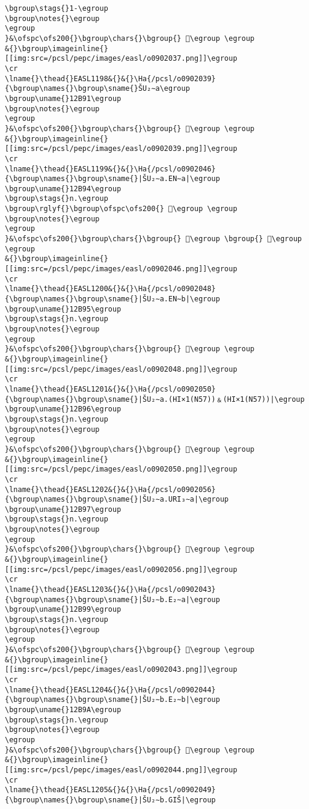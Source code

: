 \begin{verbatim}
\bgroup\stags{}1-\egroup
\bgroup\notes{}\egroup
\egroup
}&\ofspc\ofs200{}\bgroup\chars{}\bgroup{} 󲨆\egroup \egroup
&{}\bgroup\imageinline{}[[img:src=/pcsl/pepc/images/easl/o0902037.png]]\egroup
\cr
\lname{}\thead{}EASL1198&{}&{}\Ha{/pcsl/o0902039}{\bgroup\names{}\bgroup\sname{}ŠU₂∼a\egroup
\bgroup\uname{}12B91\egroup
\bgroup\notes{}\egroup
\egroup
}&\ofspc\ofs200{}\bgroup\chars{}\bgroup{} 𒮑\egroup \egroup
&{}\bgroup\imageinline{}[[img:src=/pcsl/pepc/images/easl/o0902039.png]]\egroup
\cr
\lname{}\thead{}EASL1199&{}&{}\Ha{/pcsl/o0902046}{\bgroup\names{}\bgroup\sname{}|ŠU₂∼a.EN∼a|\egroup
\bgroup\uname{}12B94\egroup
\bgroup\stags{}n.\egroup
\bgroup\rglyf{}\bgroup\ofspc\ofs200{} 𒮔\egroup \egroup
\bgroup\notes{}\egroup
\egroup
}&\ofspc\ofs200{}\bgroup\chars{}\bgroup{} 𒮓\egroup \bgroup{} 𒮔\egroup \egroup
&{}\bgroup\imageinline{}[[img:src=/pcsl/pepc/images/easl/o0902046.png]]\egroup
\cr
\lname{}\thead{}EASL1200&{}&{}\Ha{/pcsl/o0902048}{\bgroup\names{}\bgroup\sname{}|ŠU₂∼a.EN∼b|\egroup
\bgroup\uname{}12B95\egroup
\bgroup\stags{}n.\egroup
\bgroup\notes{}\egroup
\egroup
}&\ofspc\ofs200{}\bgroup\chars{}\bgroup{} 𒮕\egroup \egroup
&{}\bgroup\imageinline{}[[img:src=/pcsl/pepc/images/easl/o0902048.png]]\egroup
\cr
\lname{}\thead{}EASL1201&{}&{}\Ha{/pcsl/o0902050}{\bgroup\names{}\bgroup\sname{}|ŠU₂∼a.(HI×1(N57))﹠(HI×1(N57))|\egroup
\bgroup\uname{}12B96\egroup
\bgroup\stags{}n.\egroup
\bgroup\notes{}\egroup
\egroup
}&\ofspc\ofs200{}\bgroup\chars{}\bgroup{} 𒮖\egroup \egroup
&{}\bgroup\imageinline{}[[img:src=/pcsl/pepc/images/easl/o0902050.png]]\egroup
\cr
\lname{}\thead{}EASL1202&{}&{}\Ha{/pcsl/o0902056}{\bgroup\names{}\bgroup\sname{}|ŠU₂∼a.URI₃∼a|\egroup
\bgroup\uname{}12B97\egroup
\bgroup\stags{}n.\egroup
\bgroup\notes{}\egroup
\egroup
}&\ofspc\ofs200{}\bgroup\chars{}\bgroup{} 𒮗\egroup \egroup
&{}\bgroup\imageinline{}[[img:src=/pcsl/pepc/images/easl/o0902056.png]]\egroup
\cr
\lname{}\thead{}EASL1203&{}&{}\Ha{/pcsl/o0902043}{\bgroup\names{}\bgroup\sname{}|ŠU₂∼b.E₂∼a|\egroup
\bgroup\uname{}12B99\egroup
\bgroup\stags{}n.\egroup
\bgroup\notes{}\egroup
\egroup
}&\ofspc\ofs200{}\bgroup\chars{}\bgroup{} 𒮙\egroup \egroup
&{}\bgroup\imageinline{}[[img:src=/pcsl/pepc/images/easl/o0902043.png]]\egroup
\cr
\lname{}\thead{}EASL1204&{}&{}\Ha{/pcsl/o0902044}{\bgroup\names{}\bgroup\sname{}|ŠU₂∼b.E₂∼b|\egroup
\bgroup\uname{}12B9A\egroup
\bgroup\stags{}n.\egroup
\bgroup\notes{}\egroup
\egroup
}&\ofspc\ofs200{}\bgroup\chars{}\bgroup{} 𒮚\egroup \egroup
&{}\bgroup\imageinline{}[[img:src=/pcsl/pepc/images/easl/o0902044.png]]\egroup
\cr
\lname{}\thead{}EASL1205&{}&{}\Ha{/pcsl/o0902049}{\bgroup\names{}\bgroup\sname{}|ŠU₂∼b.GIŠ|\egroup

\end{verbatim}

